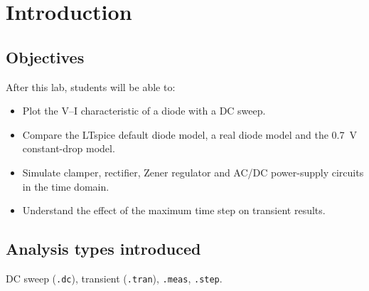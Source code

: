 \section{Introduction}


\subsection{Objectives}
After this lab, students will be able to:
\begin{itemize}[itemsep=2pt]
  \item Plot the V--I characteristic of a diode with a DC sweep.
  \item Compare the LTspice default diode model, a real diode model and the 0.7~V constant-drop model.
  \item Simulate clamper, rectifier, Zener regulator and AC/DC power-supply circuits in the time domain.
  \item Understand the effect of the maximum time step on transient results.
\end{itemize}

\subsection{Analysis types introduced}
DC sweep (\texttt{.dc}), transient (\texttt{.tran}), \texttt{.meas}, \texttt{.step}.
